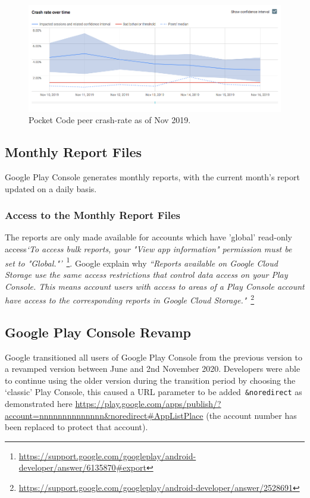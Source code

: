\begin{figure}[htbp!]
    \centering
    \includegraphics[width=\textwidth]{images/android-vitals-screenshots/peer-crash-rate-catrobat-18-nov-2019.jpg}
    \caption{Pocket Code peer crash-rate as of  Nov 2019.}
    \label{fig:pocketcode_peer_crash_rate_18_nov_2019}
\end{figure}{}


\subsection{Monthly Report Files}

Google Play Console generates monthly reports, with the current month's report updated on a daily basis. 


\subsubsection{Access to the Monthly Report Files}
The reports are only made available for accounts which have 'global' read-only access\emph{`To access bulk reports, your "View app information" permission must be set to "Global."'}~\footnote{\url{https://support.google.com/googleplay/android-developer/answer/6135870\#export}}. Google explain why \emph{``Reports available on Google Cloud Storage use the same access restrictions that control data access on your Play Console. This means account users with access to areas of a Play Console account have access to the corresponding reports in Google Cloud Storage."}~\footnote{\url{https://support.google.com/googleplay/android-developer/answer/2528691}}  

\subsection{Google Play Console Revamp}
Google transitioned all users of Google Play Console from the previous version to a revamped version between June and 2nd November 2020. Developers were able to continue using the older version during the transition period by choosing the `classic' Play Console, this caused a URL parameter to be added~\texttt{\&noredirect} as demonstrated here
\url{https://play.google.com/apps/publish/?account=nnnnnnnnnnnnnn\&noredirect#AppListPlace} (the account number has been replaced to protect that account).


